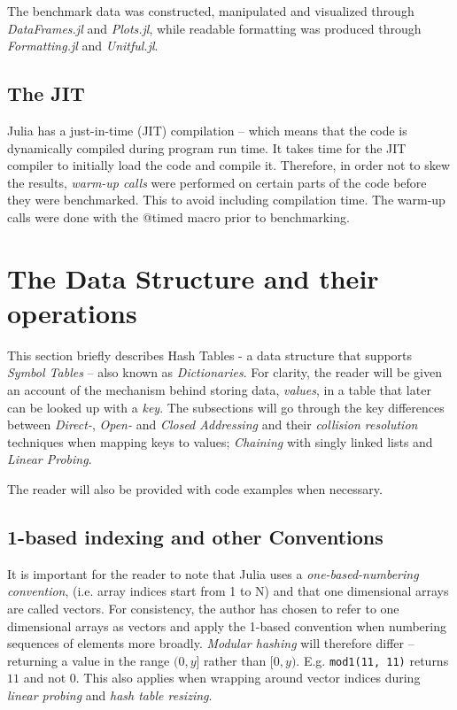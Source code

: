 \documentclass[a4paper, 11pt]{article}
\begin{document}
    The benchmark data was constructed, manipulated and visualized through
    \emph{DataFrames.jl} and \emph{Plots.jl}, 
    while readable formatting was produced through 
    \emph{Formatting.jl} and \emph{Unitful.jl}. 

    \subsection*{The JIT}
    Julia has a just-in-time (JIT) compilation -- which means that the code is
    dynamically compiled during program run time.     
    It takes time for the JIT compiler to 
    initially load the code and compile it. Therefore, in order not to skew the
    results, \emph{warm-up calls} were performed on certain parts of the code
    before they were benchmarked. This to avoid including 
    compilation time. The warm-up calls were done with the @timed macro prior to
    benchmarking.

    \section*{The Data Structure and their operations} %
    This section briefly describes Hash Tables - a data structure that supports
    \emph{Symbol Tables} -- also known as \emph{Dictionaries}. 
    For clarity, the reader will be given an account of the mechanism 
    behind storing data, \emph{values}, in a table 
    that later can be looked up with a \emph{key}. 
    The subsections will go through the key differences between 
    \emph{Direct-}, \emph{Open-} and \emph{Closed Addressing} and their
    \emph{collision resolution} techniques when mapping keys to values; 
    \emph{Chaining} with singly linked lists
    and \emph{Linear Probing}. 
    
    The reader will also be provided with code examples when necessary.
    
    \subsection*{1-based indexing and other Conventions}
    It is important for the reader to note that Julia uses a \emph{one-based-numbering
    convention}, (i.e. array indices start from 1 to N) and that one dimensional
    arrays are called vectors.  
    For consistency, the author has chosen to refer to one dimensional
    arrays as vectors and apply the 1-based convention when numbering
    sequences of elements more broadly. \emph{Modular hashing} 
    will therefore differ -- 
    returning a value in the range $(0,y]$ rather than $[0,y)$. E.g.
    \texttt{mod1(11, 11)} returns $11$ and not $0$. This also
    applies when wrapping around vector indices during \emph{linear probing}
    and \emph{hash table resizing}.
        
\end{document}
